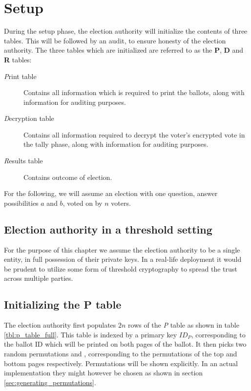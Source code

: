 \chapter{Setup}

During the setup phase, the election authority will initialize the contents of
three tables. This will be followed by an audit, to ensure honesty of the
election authority. The three tables which are initialized are referred to as
the \textbf{P}, \textbf{D} and \textbf{R} tables:
\begin{description}
\item[\emph{P}rint table] Contains all information which is required to print
the ballots, along with information for auditing purposes.
\item[\emph{D}ecryption table] Contains all information required to decrypt the
voter's encrypted vote in the tally phase, along with information for auditing
purposes.
\item[\emph{R}esults table] Contains outcome of election.
\end{description}

For the following, we will assume an election with one question, answer
possibilities $a$ and $b$, voted on by $n$ voters.

\section{Election authority in a threshold setting}

For the purpose of this chapter we assume the election authority to be a single entity, in full possession of their private keys. In a real-life deployment it would be prudent to utilize some form of threshold cryptography to spread the trust across multiple parties.

\section{Initializing the \textbf{P} table}

The election authority first populates $2n$ rows of the \emph{P} table as shown
in table \ref{tbl:p_table_full}. This table is indexed by a primary key $ID_P$,
corresponding to the ballot ID which will be printed on both pages of the
ballot. It then picks two random permutations \ptop{} and \pbottom{},
corresponding to the permutations of the top and bottom pages respectively.
Permutations will be shown explicitly. In an actual implementation they might
however be chosen as shown in section \ref{sec:generating_permutations}.

